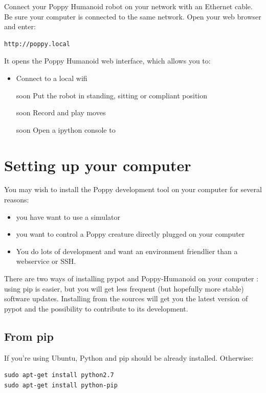 \documentclass{article}
\begin{document}
Connect your Poppy Humanoid robot on your network with an Ethernet cable. Be sure your computer is connected to the same network. Open your web browser and enter:

\begin{verbatim}
http://poppy.local
\end{verbatim}

It opens the Poppy Humanoid web interface, which allows you to:

\begin{itemize}
\item Connect to a local wifi
\item [soon] Put the robot in standing, sitting or compliant position
\item [soon] Record and play moves
\item [soon] Open a ipython console to 
\end{itemize}


\section{Setting up your computer}
\label{installing-pypot}
You may wish to install the Poppy development tool on your computer for several reasons:

\begin{itemize}
\item you have want to use a simulator
\item you want to control a Poppy creature directly plugged on your computer
\item You do lots of development and want an environment friendlier than a webservice or SSH.
\end{itemize}


There are two ways of installing pypot and Poppy-Humanoid on your computer : using pip is easier, but you will get less frequent (but hopefully more stable) software updates. Installing from the sources will get you the latest version of pypot and the possibility to contribute to its development.

\subsection{From pip}
If you're using Ubuntu, Python and pip should be already installed. Otherwise:
\begin{verbatim}
sudo apt-get install python2.7
sudo apt-get install python-pip
\end{verbatim}
\end{document}
